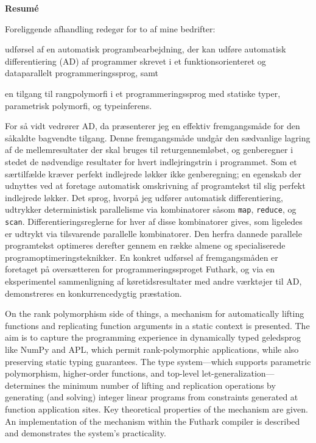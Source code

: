 \newpage
\begin{center}
\textbf{Resum\'e}
\end{center}
Foreliggende afhandling redegør for to af mine bedrifter:
\begin{enumerate*}[label=\arabic*)]
\item udførsel af en automatisk programbearbejdning, der kan udføre
  automatisk differentiering (AD) af programmer skrevet i et
  funktionsorienteret og dataparallelt programmeringssprog, samt
\item en tilgang til rangpolymorfi i et programmeringssprog med
  statiske typer, parametrisk polymorfi, og typeinferens.
\end{enumerate*}

For så vidt vedrører AD, da præsenterer jeg en effektiv fremgangsmåde
for den såkaldte bagvendte tilgang. Denne fremgangsmåde undgår den
sædvanlige lagring af de mellemresultater der skal bruges til
returgennemløbet, og genberegner i stedet de nødvendige resultater for
hvert indlejringstrin i programmet. Som et særtilfælde kræver perfekt
indlejrede løkker ikke genberegning; en egenskab der udnyttes ved at
foretage automatisk omskrivning af programtekst til slig perfekt
indlejrede løkker.
%
Det sprog, hvorpå jeg udfører automatisk differentiering, udtrykker
deterministisk parallelisme via kombinatorer såsom \texttt{map},
\texttt{reduce}, og \texttt{scan}. Differentieringsreglerne for hver
af disse kombinatorer gives, som ligeledes er udtrykt via tilsvarende
parallelle kombinatorer. Den herfra dannede parallele programtekst
optimeres derefter gennem en række almene og specialiserede
programoptimeringsteknikker.
%
En konkret udførsel af fremgangsmåden er foretaget på oversætteren for
programmeringssproget Futhark, og via en eksperimentel sammenligning
af køretidsresultater med andre værktøjer til AD, demonstreres en
konkurrencedygtig præstation.

On the rank polymorphism side of things, a mechanism for automatically lifting
functions and replicating function arguments in a static context is
presented. The aim is to capture the programming experience in dynamically typed
geledsprog like NumPy and APL, which permit rank-polymorphic applications,
while also preserving static typing guarantees. The type system---which supports
parametric polymorphism, higher-order functions, and top-level
let-generalization---determines the minimum number of lifting and replication
operations by generating (and solving) integer linear programs from constraints
generated at function application sites. Key theoretical properties of the
mechanism are given. An implementation of the mechanism within the Futhark
compiler is described and demonstrates the system's practicality.
